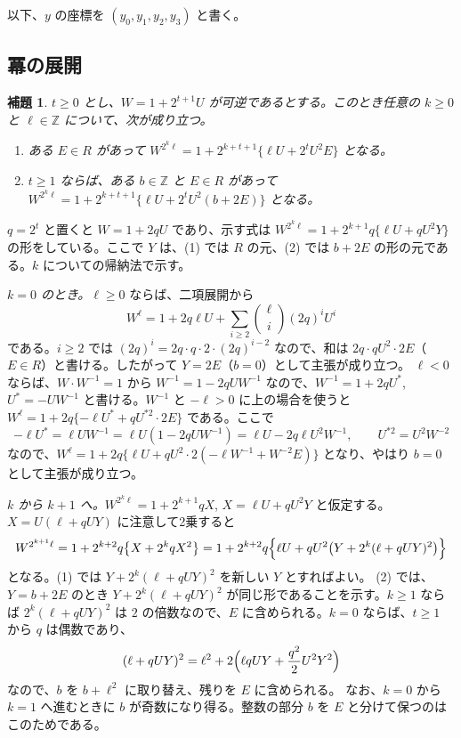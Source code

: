 \documentclass[a4paper,11pt]{ltjsarticle}
\makeatletter
\theoremstyle{jplain}
\newtheorem{lemma}[theorem]{補題}
\renewcommand{\proofname}{証明}
\renewenvironment{proof}[1][\proofname]{\par\pushQED{\qed}\normalfont\topsep6\p@\@plus6\p@\relax
  \trivlist\item[\hskip\labelsep\bfseries #1]\ignorespaces}{\popQED\endtrivlist\@endpefalse}
\numberwithin{equation}{section}
\numberwithin{table}{section}
\newcommand{\Z}{\mathbb{Z}}
\makeatother
\begin{document}
以下、$y$ の座標を $(y_0,y_1,y_2,y_3)$ と書く。

\subsection{冪の展開}

\begin{lemma}\label{lem:power}
$t\ge0$ とし、$W=1+2^{t+1}U$ が可逆であるとする。このとき任意の $k\ge0$ と $\ell\in\Z$ について、次が成り立つ。
\begin{enumerate}
\item ある $E\in R$ があって $W^{2^k\ell}=1+2^{k+t+1}\bigl\{\ell U+2^tU^2E\bigr\}$ となる。
\item $t\ge1$ ならば、ある $b\in\Z$ と $E\in R$ があって $W^{2^k\ell}=1+2^{k+t+1}\bigl\{\ell U+2^tU^2(b+2E)\bigr\}$ となる。
\end{enumerate}
\end{lemma}

\begin{proof}
$q=2^t$ と置くと $W=1+2qU$ であり、示す式は $W^{2^k\ell}=1+2^{k+1}q\{\ell U+qU^2Y\}$ の形をしている。ここで $Y$ は、(1) では $R$ の元、(2) では $b+2E$ の形の元である。$k$ についての帰納法で示す。

\emph{$k=0$ のとき。}$\ell\ge0$ ならば、二項展開から
\[
W^\ell=1+2q\ell U+\sum_{i\ge2}\binom{\ell}{i}(2q)^iU^i
\]
である。$i\ge2$ では $(2q)^i=2q\cdot q\cdot2\cdot(2q)^{i-2}$ なので、和は $2q\cdot qU^2\cdot2E$（$E\in R$）と書ける。したがって $Y=2E$（$b=0$）として主張が成り立つ。
$\ell<0$ ならば、$W\cdot W^{-1}=1$ から $W^{-1}=1-2qUW^{-1}$ なので、$W^{-1}=1+2qU^*$, $U^*=-UW^{-1}$ と書ける。$W^{-1}$ と $-\ell>0$ に上の場合を使うと $W^\ell=1+2q\{-\ell U^*+qU^{*2}\cdot2E\}$ である。ここで
\[
-\ell U^*=\ell UW^{-1}=\ell U(1-2qUW^{-1})=\ell U-2q\ell U^2W^{-1},\qquad U^{*2}=U^2W^{-2}
\]
なので、$W^\ell=1+2q\bigl\{\ell U+qU^2\cdot2(-\ell W^{-1}+W^{-2}E)\bigr\}$ となり、やはり $b=0$ として主張が成り立つ。

\emph{$k$ から $k+1$ へ。}$W^{2^k\ell}=1+2^{k+1}qX$, $X=\ell U+qU^2Y$ と仮定する。$X=U(\ell+qUY)$ に注意して2乗すると
\[
W^{2^{k+1}\ell}=1+2^{k+2}q\bigl\{X+2^kqX^2\bigr\}=1+2^{k+2}q\Bigl\{\ell U+qU^2\bigl(Y+2^k(\ell+qUY)^2\bigr)\Bigr\}
\]
となる。(1) では $Y+2^k(\ell+qUY)^2$ を新しい $Y$ とすればよい。
(2) では、$Y=b+2E$ のとき $Y+2^k(\ell+qUY)^2$ が同じ形であることを示す。$k\ge1$ ならば $2^k(\ell+qUY)^2$ は $2$ の倍数なので、$E$ に含められる。$k=0$ ならば、$t\ge1$ から $q$ は偶数であり、
\[
(\ell+qUY)^2=\ell^2+2\Bigl(\ell qUY+\frac{q^2}2U^2Y^2\Bigr)
\]
なので、$b$ を $b+\ell^2$ に取り替え、残りを $E$ に含められる。
なお、$k=0$ から $k=1$ へ進むときに $b$ が奇数になり得る。整数の部分 $b$ を $E$ と分けて保つのはこのためである。
\end{proof}
\end{document}
